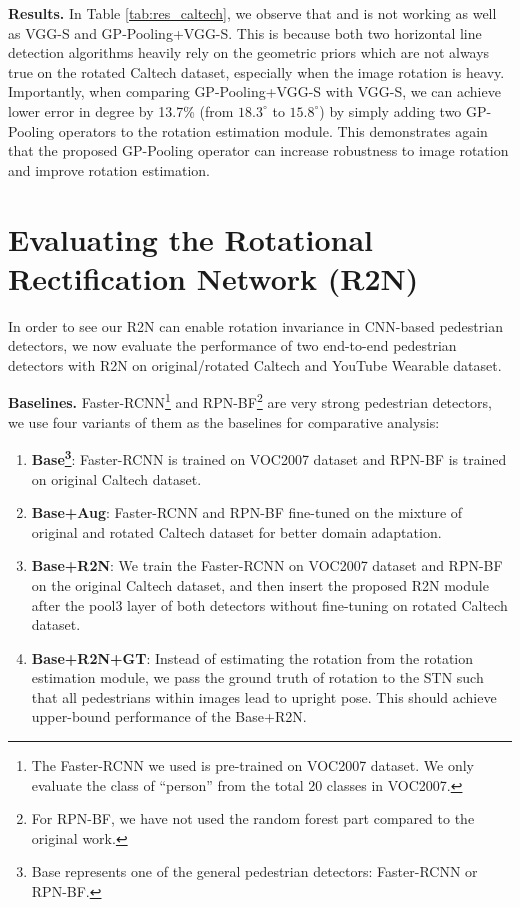 \documentclass[10pt,twocolumn,letterpaper]{article}
\begin{document}
\vspace{1mm}\noindent\textbf{Results.} In Table \ref{tab:res_caltech}, we observe that \cite{Zhang2016} and \cite{Lezama2014} is not working as well as VGG-S and GP-Pooling+VGG-S. This is because both two horizontal line detection algorithms heavily rely on the geometric priors which are not always true on the rotated Caltech dataset, especially when the image rotation is heavy. Importantly, when comparing GP-Pooling+VGG-S with VGG-S, we can achieve lower error in degree by 13.7\% (from $18.3^{\circ}$ to $15.8^{\circ}$) by simply adding two GP-Pooling operators to the rotation estimation module. This demonstrates again that the proposed GP-Pooling operator can increase robustness to image rotation and improve rotation estimation.

\section{Evaluating the Rotational Rectification Network (R2N)}
\label{sec:r2n}
In order to see our R2N can enable rotation invariance in CNN-based pedestrian detectors, we now evaluate the performance of two end-to-end pedestrian detectors with R2N on original/rotated Caltech and YouTube Wearable dataset.

\vspace{1mm}
\noindent\textbf{Baselines.} Faster-RCNN\footnote{The Faster-RCNN we used is pre-trained on VOC2007 dataset. We only evaluate the class of ``person'' from the total 20 classes in VOC2007.} \cite{Ren2015} and RPN-BF\footnote{For RPN-BF, we have not used the random forest part compared to the original work.} \cite{Zhang2016} are very strong pedestrian detectors, we use four variants of them as the baselines for comparative analysis: 

\vspace{-0.3cm}
\begin{enumerate}
    \setlength\topsep{-1.5mm}
    \setlength\itemsep{-1.5mm}
    \item \textbf{Base\footnote{Base represents one of the general pedestrian detectors: Faster-RCNN or RPN-BF.}}: Faster-RCNN is trained on VOC2007 dataset and RPN-BF is trained on original Caltech dataset.
    \item \textbf{Base+Aug}: Faster-RCNN and RPN-BF fine-tuned on the mixture of original and rotated Caltech dataset for better domain adaptation.
    \item \textbf{Base+R2N}: We train the Faster-RCNN on VOC2007 dataset and RPN-BF on the original Caltech dataset, and then insert the proposed R2N module after the pool3 layer of both detectors without fine-tuning on rotated Caltech dataset.
    \item \textbf{Base+R2N+GT}: Instead of estimating the rotation from the rotation estimation module, we pass the ground truth of rotation to the STN such that all pedestrians within images lead to upright pose. This should achieve upper-bound performance of the Base+R2N.
    \end{enumerate}
\vspace{-0.2cm}
\end{document}
